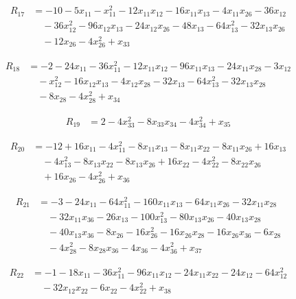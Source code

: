 \documentclass[11pt,letterpaper]{article}
\theoremstyle{definition}
\theoremstyle{remark}
\begin{document}
\begin{align*}
R_{17} &= -10 -5 x_{11} -x_{11}^{2} -12 x_{11} x_{12} -16 x_{11} x_{13} -4 x_{11} x_{26} -36 x_{12} \\
&\quad -36 x_{12}^{2} -96 x_{12} x_{13} -24 x_{12} x_{26} -48 x_{13} -64 x_{13}^{2} -32 x_{13} x_{26} \\
&\quad -12 x_{26} -4 x_{26}^{2} +x_{33}
\end{align*}

\begin{align*}
R_{18} &= -2 -24 x_{11} -36 x_{11}^{2} -12 x_{11} x_{12} -96 x_{11} x_{13} -24 x_{11} x_{28} -3 x_{12} \\
&\quad -x_{12}^{2} -16 x_{12} x_{13} -4 x_{12} x_{28} -32 x_{13} -64 x_{13}^{2} -32 x_{13} x_{28} \\
&\quad -8 x_{28} -4 x_{28}^{2} +x_{34}
\end{align*}

\begin{align*}
R_{19} &= 2 -4 x_{33}^{2} -8 x_{33} x_{34} -4 x_{34}^{2} +x_{35}
\end{align*}

\begin{align*}
R_{20} &= -12 +16 x_{11} -4 x_{11}^{2} -8 x_{11} x_{13} -8 x_{11} x_{22} -8 x_{11} x_{26} +16 x_{13} \\
&\quad -4 x_{13}^{2} -8 x_{13} x_{22} -8 x_{13} x_{26} +16 x_{22} -4 x_{22}^{2} -8 x_{22} x_{26} \\
&\quad +16 x_{26} -4 x_{26}^{2} +x_{36}
\end{align*}

\begin{align*}
R_{21} &= -3 -24 x_{11} -64 x_{11}^{2} -160 x_{11} x_{13} -64 x_{11} x_{26} -32 x_{11} x_{28} \\
&\quad -32 x_{11} x_{36} -26 x_{13} -100 x_{13}^{2} -80 x_{13} x_{26} -40 x_{13} x_{28} \\
&\quad -40 x_{13} x_{36} -8 x_{26} -16 x_{26}^{2} -16 x_{26} x_{28} -16 x_{26} x_{36} -6 x_{28} \\
&\quad -4 x_{28}^{2} -8 x_{28} x_{36} -4 x_{36} -4 x_{36}^{2} +x_{37}
\end{align*}

\begin{align*}
R_{22} &= -1 -18 x_{11} -36 x_{11}^{2} -96 x_{11} x_{12} -24 x_{11} x_{22} -24 x_{12} -64 x_{12}^{2} \\
&\quad -32 x_{12} x_{22} -6 x_{22} -4 x_{22}^{2} +x_{38}
\end{align*}
\end{document}
